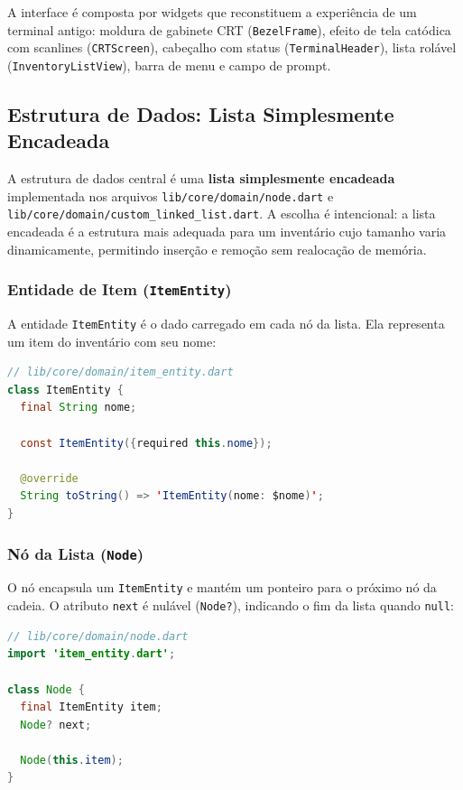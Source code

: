 \documentclass[12pt,a4paper]{article}
\begin{document}
A interface é composta por widgets que reconstituem a experiência de um terminal antigo: moldura de gabinete CRT (\texttt{BezelFrame}), efeito de tela catódica com scanlines (\texttt{CRTScreen}), cabeçalho com status (\texttt{TerminalHeader}), lista rolável (\texttt{InventoryListView}), barra de menu e campo de prompt.

\subsection{Estrutura de Dados: Lista Simplesmente Encadeada}

A estrutura de dados central é uma \textbf{lista simplesmente encadeada} implementada nos arquivos \texttt{lib/core/domain/node.dart} e \texttt{lib/core/domain/custom\_linked\_list.dart}. A escolha é intencional: a lista encadeada é a estrutura mais adequada para um inventário cujo tamanho varia dinamicamente, permitindo inserção e remoção sem realocação de memória.

\subsubsection{Entidade de Item (\texttt{ItemEntity})}

A entidade \texttt{ItemEntity} é o dado carregado em cada nó da lista. Ela representa um item do inventário com seu nome:

\begin{lstlisting}[language=java]
// lib/core/domain/item_entity.dart
class ItemEntity {
  final String nome;

  const ItemEntity({required this.nome});

  @override
  String toString() => 'ItemEntity(nome: $nome)';
}
\end{lstlisting}

\subsubsection{Nó da Lista (\texttt{Node})}

O nó encapsula um \texttt{ItemEntity} e mantém um ponteiro para o próximo nó da cadeia. O atributo \texttt{next} é nulável (\texttt{Node?}), indicando o fim da lista quando \texttt{null}:

\begin{lstlisting}[language=java]
// lib/core/domain/node.dart
import 'item_entity.dart';

class Node {
  final ItemEntity item;
  Node? next;

  Node(this.item);
}
\end{lstlisting}
\end{document}
